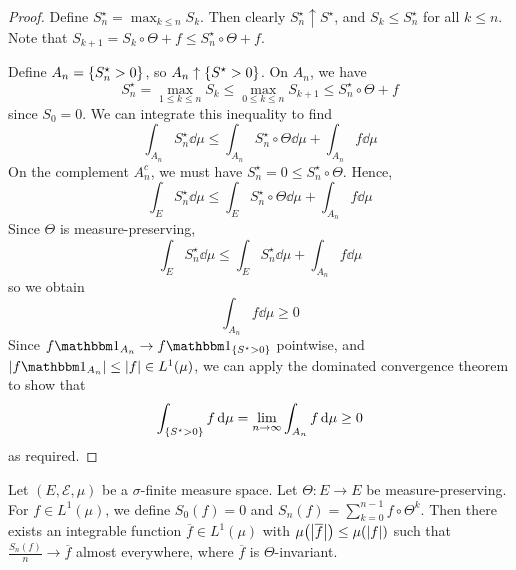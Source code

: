 \begin{proof}
    Define \( S_n^\star = \max_{k \leq n} S_k \).
    Then clearly \( S_n^\star \uparrow S^\star \), and \( S_k \leq S_n^\star \) for all \( k \leq n \).
    Note that \( S_{k+1} = S_k \circ \Theta + f \leq S_n^\star \circ \Theta + f \).

    Define \( A_n = \qty{S_n^\star > 0} \), so \( A_n \uparrow \qty{S^\star > 0} \).
    On \( A_n \), we have
    \[ S_n^\star = \max_{1 \leq k \leq n} S_k \leq \max_{0 \leq k \leq n} S_{k+1} \leq S_n^\star \circ \Theta + f \]
    since \( S_0 = 0 \).
    We can integrate this inequality to find
    \[ \int_{A_n} S_n^\star \dd{\mu} \leq \int_{A_n} S_n^\star \circ \Theta \dd{\mu} + \int_{A_n} f \dd{\mu} \]
    On the complement \( A_n^c \), we must have \( S_n^\star = 0 \leq S_n^\star \circ \Theta \).
    Hence,
    \[ \int_E S_n^\star \dd{\mu} \leq \int_E S_n^\star \circ \Theta \dd{\mu} + \int_{A_n} f \dd{\mu} \]
    Since \( \Theta \) is measure-preserving,
    \[ \int_E S_n^\star \dd{\mu} \leq \int_E S_n^\star \dd{\mu} + \int_{A_n} f \dd{\mu} \]
    so we obtain
    \[ \int_{A_n} f \dd{\mu} \geq 0 \]
    Since \( f \mathbbm 1_{A_n} \to f \mathbbm 1_{\qty{S^\star > 0}} \) pointwise, and \( \abs{f \mathbbm 1_{A_n}} \leq \abs{f} \in L^1(\mu) \), we can apply the dominated convergence theorem to show that
    \[ \int_{\qty{S^\star > 0}} f \dd{\mu} = \lim_{n \to \infty} \int_{A_n} f \dd{\mu} \geq 0 \]
    as required.
\end{proof}
\begin{theorem}[Birkhoff]
	Let \( (E, \mathcal E, \mu) \) be a \( \sigma \)-finite measure space.
	Let \( \Theta \colon E \to E \) be measure-preserving.
	For \( f \in L^1(\mu) \), we define \( S_0(f) = 0 \) and \( S_n(f) = \sum_{k=0}^{n-1} f \circ \Theta^k \).
	Then there exists an integrable function \( \overline f \in L^1(\mu) \) with \( \mu\qty(\abs{\overline f}) \leq \mu(\abs{f}) \) such that \( \frac{S_n(f)}{n} \to \overline f \) almost everywhere, where \( \overline f \) is \( \Theta \)-invariant.
\end{theorem}
